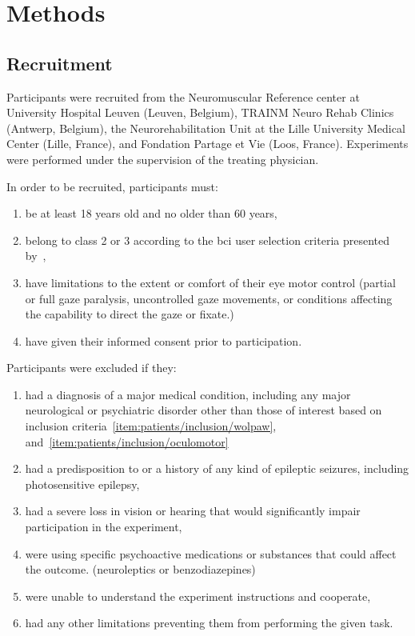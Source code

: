 \documentclass{article}
\begin{document}
\section{Methods}
\subsection{Recruitment}
Participants were recruited from the Neuromuscular Reference center at
University Hospital Leuven (Leuven, Belgium), TRAINM Neuro Rehab Clinics
(Antwerp, Belgium), the Neurorehabilitation Unit at the Lille University
Medical Center (Lille, France), and Fondation Partage et Vie (Loos,
France).
Experiments were performed under the supervision of the treating physician.

In order to be recruited, participants must:
\begin{enumerate}
	\item be at least 18 years old and no older than 60
	      years,
	\item belong to class 2 or 3 according to the \ac{bci}	user selection criteria
	      presented by~\textcite{Wolpaw2006},
	      \label{item:patients/inclusion/wolpaw}
	\item have limitations to the extent or comfort of their eye motor control
	      (partial or full gaze paralysis, uncontrolled gaze movements, or conditions affecting the capability to direct the gaze or fixate.)
	      \label{item:patients/inclusion/oculomotor}
	\item have given their informed consent prior to participation.
\end{enumerate}
Participants were excluded if they:
\begin{enumerate}
	\item had a diagnosis of a major medical condition, including any major
	      neurological or psychiatric disorder other than those of interest based on
	      inclusion criteria~\ref{item:patients/inclusion/wolpaw},
	      and~\ref{item:patients/inclusion/oculomotor}\label{item:patients/exclusion/medical}
	\item had a predisposition to or a history of any kind of epileptic seizures,
	      including photosensitive epilepsy,\label{item:patients/exclusion/epilepsy}
	\item had a severe loss in vision or hearing that would significantly impair
	      participation in the experiment,\label{item:patients/exclusion/vision}
	\item were using specific psychoactive medications or substances that could affect the outcome.
	      (neuroleptics or benzodiazepines)
	      \label{item:patients/exclusion/cognitive}
	\item were unable to understand the experiment instructions and cooperate,
	\item had any other limitations preventing them from performing the given task.
\end{enumerate}
\end{document}

